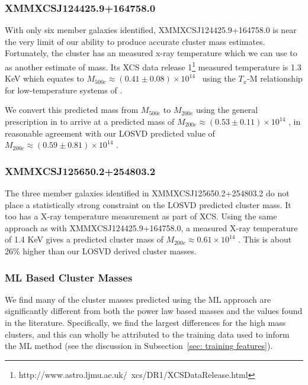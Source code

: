\subsubsection{XMMXCSJ124425.9+164758.0}
With only six member galaxies identified, XMMXCSJ124425.9+164758.0 is near the very limit of our ability to produce accurate cluster mass estimates. Fortunately, the cluster has an measured x-ray temperature which we can use to as another estimate of mass. Its XCS data release 1\footnote{http://www.astro.ljmu.ac.uk/~xcs/DR1/XCSDataRelease.html} \citep{Mehrtens2012} measured temperature is 1.3 KeV which equates to $M_{500c}\approx(0.41\pm0.08)\times10^{14}$ \Msol\ using the $T_x$-M relationship for low-temperature systems of \cite{Finoguenov2001}.

We convert this predicted mass from $M_{500c}$ to $M_{200c}$ using the general prescription in \cite{Hu2003} to arrive at a predicted mass of $M_{200c} \approx (0.53\pm0.11)\times10^{14}$ \Msol, in reasonable agreement with our LOSVD predicted value of $M_{200c} \approx (0.59\pm0.81)\times10^{14}$ \Msol.

\subsubsection{XMMXCSJ125650.2+254803.2}
The three member galaxies identified in XMMXCSJ125650.2+254803.2 do not place a statistically strong constraint on the LOSVD predicted cluster mass. It too has a X-ray temperature measurement as part of XCS. Using the same approach as with XMMXCSJ124425.9+164758.0, a measured X-ray temperature of 1.4 KeV gives a predicted cluster mass of $M_{200c} \approx 0.61\times10^{14}$ \Msol. This is about 26\% higher than our LOSVD derived cluster masses. 

\subsubsection{ML Based Cluster Masses}
We find many of the cluster masses predicted using the ML approach are significantly different from both the power law based masses and the values found in the literature. Specifically, we find the largest differences for the high mass clusters, and this can wholly be attributed to the training data used to inform the ML method (see the discussion in Subsection~\ref{sec: training features}). 

